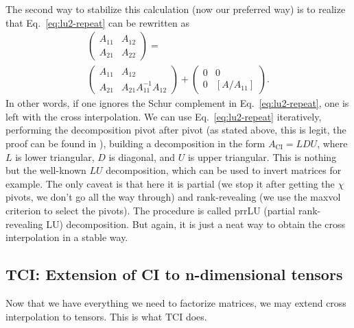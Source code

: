 \documentclass{SciPost}
\begin{document}
The second way to stabilize this calculation (now our preferred way) is to realize
that Eq.~\eqref{eq:lu2-repeat} can be rewritten as
\begin{eqnarray}
\label{eq:prrlu}
\begin{pmatrix}
A_{11} & A_{12} \\
A_{21} & A_{22}
\end{pmatrix} =
\nonumber \\
\begin{pmatrix}
A_{11} & A_{12} \\
A_{21} & A_{21}A_{11}^{-1} A_{12}
\end{pmatrix}
+
\begin{pmatrix}
0 & 0 \\
0 & [A / A_{11}]
\end{pmatrix}.
\end{eqnarray}
In other words, if one ignores the Schur complement in Eq.~\eqref{eq:lu2-repeat}, one is left with the cross interpolation. We can use Eq.~\eqref{eq:lu2-repeat} iteratively,
performing the decomposition pivot after pivot (as stated above, this is legit, the proof can be found in \cite{nunez2025}), building a decomposition in the form
$A_{\mathrm{CI}} = LDU$, where $L$ is lower triangular, $D$ is diagonal, and $U$ is upper triangular. This is nothing but the well-known $LU$ decomposition, which can be used to invert matrices for example. The only caveat is that here it is partial (we stop it after getting the $\chi$ pivots, we don't go all the way through) and rank-revealing (we use the maxvol criterion to select the pivots). The procedure is called prrLU (partial rank-revealing LU) decomposition. But again, it is just a neat way to obtain the cross interpolation in a stable way.

\subsection{TCI: Extension of CI to n-dimensional tensors}
Now that we have everything we need to factorize matrices, we may extend cross interpolation to tensors. This is what TCI does.
\end{document}
